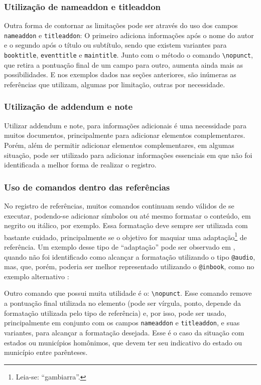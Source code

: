 \subsubsection{Utilização de nameaddon e titleaddon}
Outra forma de contornar as limitações pode ser através do uso dos campos \texttt{nameaddon} e \texttt{titleaddon}: O primeiro adiciona informações após o nome do autor e o segundo após o título ou subtítulo, sendo que existem variantes para \texttt{booktitle}, \texttt{eventtitle} e \texttt{maintitle}. Junto com o método o comando \verb|\nopunct|, que retira a pontuação final de um campo para outro, aumenta ainda mais as possibilidades. E nos exemplos dados nas seções anteriores, são inúmeras as referências que utilizam, algumas por limitação, outras por necessidade.

\subsubsection{Utilização de addendum e note}
Utilizar addendum e note, para informações adicionais é uma necessidade para muitos documentos, principalmente para adicionar elementos complementares. Porém, além de permitir adicionar elementos complementares, em algumas situação, pode ser utilizado para adicionar informações essenciais em que não foi identificada a melhor forma de realizar o registro.

\subsubsection{Uso de comandos dentro das referências}
No registro de referências, muitos comandos continuam sendo válidos de se executar, podendo-se adicionar símbolos ou até mesmo formatar o conteúdo, em negrito ou itálico, por exemplo. Essa formatação deve sempre ser utilizada com bastante cuidado, principalmente se o objetivo for maquiar uma adaptação\footnote{Leia-se: ``gambiarra''.} de referência. Um exemplo desse tipo de ``adaptação'' pode ser observado em \textcite{sonoro:ex3}, quando não foi identificado como alcançar a formatação utilizando o tipo \texttt{@audio}, mas, que, porém, poderia ser melhor representado utilizando o \texttt{@inbook}, como no exemplo alternativo \textcite{sonoro:ex3-alt}:


Outro comando que possui muita utilidade é o: \verb|\nopunct|. Esse comando remove a pontuação final utilizada no elemento (pode ser vírgula, ponto, depende da formatação utilizada pelo tipo de referência) e, por isso, pode ser usado, principalmente em conjunto com os campos \texttt{nameaddon} e \texttt{titleaddon}, e suas variantes, para alcançar a formatação desejada. Esse é o caso da situação com estados ou municípios homônimos, que devem ter seu indicativo do estado ou município entre parênteses.

